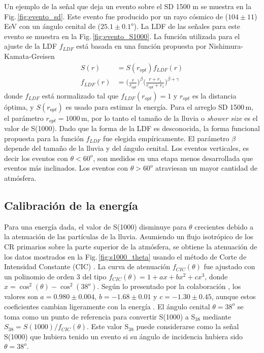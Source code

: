 Un ejemplo de la señal que deja un evento sobre el SD 1500 m se muestra en la Fig.\,\ref{fig:evento_sd}. Este evento fue producido por un rayo cósmico de ($104\pm11$)\,EeV con un ángulo cenital de ($25.1\pm0.1 ^o$). La LDF de las señales para este evento se muestra en la Fig.\,\ref{fig:evento_S1000}. La función utilizada para el ajuste de la LDF $f_{LDF}$  está basada en una función  propuesta por Nishimura-Kamata-Greisen \cite{data}
\begin{align*}
	S(r) &= S(r_{opt})f_{LDF}(r)\\
	f_{LDF}(r)&=\bigg(\frac{r}{r_{opt}}\bigg)^{\beta}\bigg(\frac{r+r_1}{r_{opt}+r_1}\bigg)^{\beta + \gamma}
\end{align*}
donde $f_{LDF}$ está normalizado tal que $f_{LDF}(r_{opt})=1$ y $r_{opt}$ es la distancia óptima, %
y $S(r_{opt})$ es usado para estimar la energía. Para el arreglo SD 1500\,m, el parámetro $r_{opt}=1000\,$m, por lo tanto el tamaño de la lluvia o \emph{shower size} es el valor de S(1000). Dado que la forma de la LDF es desconocida, la forma funcional propuesta para la función $f_{LDF}$ fue elegida empíricamente.  El parámetro $\beta$ depende del tamaño de la lluvia y del ángulo cenital. Los eventos verticales, es decir los eventos con $\theta < 60^o$, son medidos en una etapa menos desarrollada que eventos más inclinados. Los eventos con $\theta>60^o$ atraviesan un mayor cantidad de atmósfera.

\subsection{Calibración de la energía} \label{sec:gamma_B}

Para una energía dada, el valor de S(1000) disminuye para $\theta$ crecientes debido a la atenuación de las partículas de la lluvia. Asumiendo un flujo isotrópico de los CR primarios sobre la parte superior de la atmósfera, se obtiene la atenuación de los datos mostrados en la Fig.\,\ref{fig:s1000_theta}  usando el método de Corte de Intensidad Constante (CIC) \cite{CIC}. La curva de atenuación $f_{CIC}(\theta)$ fue ajustado con un polinomio de orden 3 del tipo $f_{CIC}(\theta)=1+ax+bx^2+cx^3$, donde $x=\cos^2(\theta) - \cos^2(38^o)$. Según lo presentado por la colaboración \cite{collaboration2013pierre}, los valores son $a=0.980\pm0.004$, $b=-1.68\pm0.01$ y $c=-1.30\pm 0.45$, aunque estos coeficientes cambian ligeramente con la energía \cite{data}. El ángulo cenital $\theta=38^o$ se toma como un punto de referencia para convertir S(1000) a S$_{38}$ mediante $S_{38}=S(1000)/f_{CIC}(\theta)$. Este valor S$_{38}$ puede considerarse como la señal S(1000) que hubiera tenido un evento si su ángulo de incidencia hubiera sido $\theta=38^o$.


